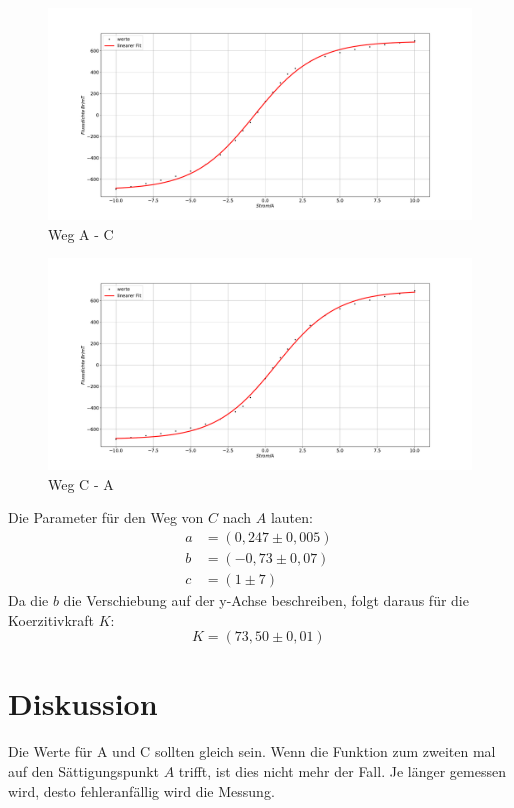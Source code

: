 \begin{figure}
\centering
\includegraphics[width=\textwidth]{plotkoertiv.pdf}
\caption{Weg A - C}
\label{fig:koe}
\end{figure}

\begin{figure}
\centering
\includegraphics[width=\textwidth]{plotkoertiv2.pdf}
\caption{Weg C - A}
\label{fig:koe2}
\end{figure}
Die Parameter für den Weg von $C$ nach $A$ lauten:
 \begin{align}
   a &= (0,247 \pm 0,005) \,\\
   b &= (-0,73 \pm 0,07)\, \\
   c &= (1 \pm 7)\,
 \end{align}
 Da die $b$ die Verschiebung auf der y-Achse beschreiben, folgt daraus für die Koerzitivkraft $K$:
 \begin{equation}
   K = (73,50 \pm  0,01) \,
\end{equation}
\section{Diskussion}
Die Werte für A und C sollten gleich sein.
Wenn die Funktion zum zweiten mal auf den Sättigungspunkt $A$ trifft, ist dies nicht mehr der Fall.
Je länger gemessen wird, desto fehleranfällig wird die Messung.
